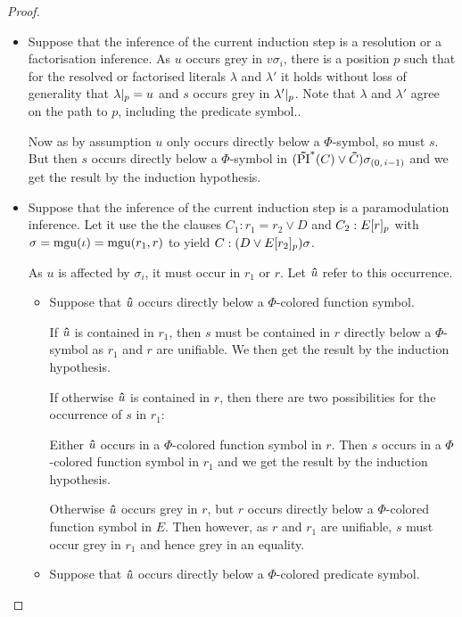 \documentclass[%
	draft=false,%
	numbers=noendperiod,%
	11pt,%
	a4paper,%
	oneside,%
	openany,%
]{memoir}
\begin{document}
\begin{proof}
\begin{itemize}
\begin{itemize}
					\begin{itemize}
						\item
							Suppose that the inference of the current induction step is a resolution or a factorisation inference.
							As $u$ occurs grey in $v\sigma_i$, there is a position $p$ such that for the resolved or factorised literals $\lambda$ and $\lambda'$ it holds without loss of generality that $\lambda|_{p} = u$ and $s$ occurs grey in $\lambda'|_{p}$.
							Note that $\lambda$ and $\lambda'$ agree on the path to $p$, including the predicate symbol..

							Now as by assumption $u$ only occurs directly below a $\Phi$-symbol, so must $s$.
							But then $s$ occurs directly below a $\Phi$-symbol in $(\bm\tilde{\operatorname{PI}}^{*}(C)\lor \bm\tilde{C})\sigma_{(0,\,i-1)}$ and we get the result by the induction hypothesis.

						\item
							Suppose that the inference of the current induction step is a paramodulation inference.
							Let it use the the clauses $C_1: r_1=r_2 \lor D$ and $C_2: E{[r]_{p}}$ with $\sigma=\operatorname{mgu}(\iota)=\operatorname{mgu}(r_1, r)$ to yield $C: (D\lor E{[r_2]_{p}})\sigma$.

							As $u$ is affected by $\sigma_i$, it must occur in $r_1$ or $r$. Let $\bm\hat u$ refer to this occurrence.

							\begin{itemize}
								\item
									Suppose that $\bm\hat u$ occurs directly below a $\Phi$-colored function symbol. 

									If $\bm\hat u$ is contained in $r_1$, then $s$ must be contained in $r$ directly below a $\Phi$-symbol as $r_1$ and $r$ are unifiable. We then get the result by the induction hypothesis.

									If otherwise $\bm\hat u$ is contained in $r$, 
									then there are two possibilities for the occurrence of $s$ in $r_1$:

									Either $\bm\hat u$ occurs in a $\Phi$-colored function symbol in $r$. Then $s$ occurs in a $\Phi$-colored function symbol in $r_1$ and we get the result by the induction hypothesis.

									Otherwise $\bm\hat u$ occurs grey in $r$, but $r$ occurs directly below a $\Phi$-colored function symbol in $E$.
									Then however, as $r$ and $r_1$ are unifiable, $s$ must occur grey in $r_1$ and hence grey in an equality.

								\item
									Suppose that $\bm\hat u$ occurs directly below a $\Phi$-colored predicate symbol. 


\end{itemize}
\end{itemize}
\end{itemize}
\end{itemize}
\end{proof}
\end{document}

